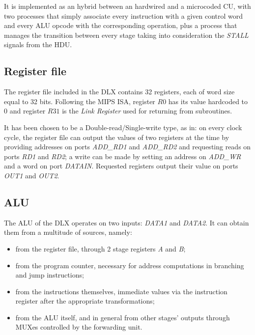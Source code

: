 It is implemented as an hybrid between an hardwired and a microcoded CU, with two processes that simply associate every instruction with a given control word and every ALU opcode with the corresponding operation, plus a process that manages the transition between every stage taking into consideration the \emph{STALL} signals from the HDU.

\subsection{Register file}
The register file included in the DLX contains 32 registers, each of word size equal to 32 bits. Following the MIPS ISA, register $ \mathit{R0} $ has its value hardcoded to 0 and register $ \mathit{R31} $ is the \emph{Link Register} used for returning from subroutines.


It has been chosen to be a Double-read/Single-write type, as in: on every clock cycle, the register file can output the values of two registers at the time by providing addresses on ports \emph{ADD\_RD1} and \emph{ADD\_RD2} and requesting reads on ports \emph{RD1} and \emph{RD2}; a write can be made by setting an address on \emph{ADD\_WR} and a word on port \emph{DATAIN}. Requested registers output their value on ports \emph{OUT1} and \emph{OUT2}. 

\subsection{ALU}
The ALU of the DLX operates on two inputs: \emph{DATA1} and \emph{DATA2}. It can obtain them from a multitude of sources, namely: 
\begin{itemize}
	\item from the register file, through 2 stage registers \emph{A} and \emph{B};
	\item from the program counter, necessary for address computations in branching and jump instructions;
	\item from the instructions themselves, immediate values via the instruction register after the appropriate transformations;
	\item from the ALU itself, and in general from other stages' outputs through MUXes controlled by the forwarding unit.
\end{itemize}



